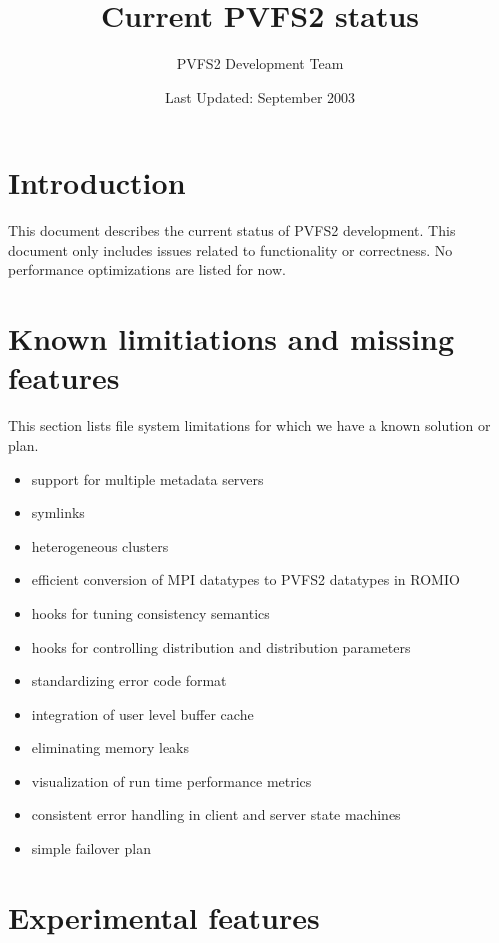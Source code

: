 \documentclass[11pt, letterpaper]{article}
\title{Current PVFS2 status}
\author{ PVFS2 Development Team }
\date{ Last Updated: September 2003 }
\begin{document}
\maketitle

\tableofcontents

\newpage

\thispagestyle{empty}

\setlength{\parindent}{0.0cm}

\section{Introduction}

This document describes the current status of PVFS2 development.  This document
only includes issues related to functionality or correctness.  No 
performance optimizations are listed for now.

\section{Known limitiations and missing features}

This section lists file system limitations for which we have a known
solution or plan.

\begin{itemize}
\item support for multiple metadata servers
\item symlinks
\item heterogeneous clusters
\item efficient conversion of MPI datatypes to PVFS2 datatypes in ROMIO
\item hooks for tuning consistency semantics
\item hooks for controlling distribution and distribution parameters
\item standardizing error code format
\item integration of user level buffer cache
\item eliminating memory leaks
\item visualization of run time performance metrics
\item consistent error handling in client and server state machines
\item simple failover plan
\end{itemize}

\section{Experimental features}
\end{document}
